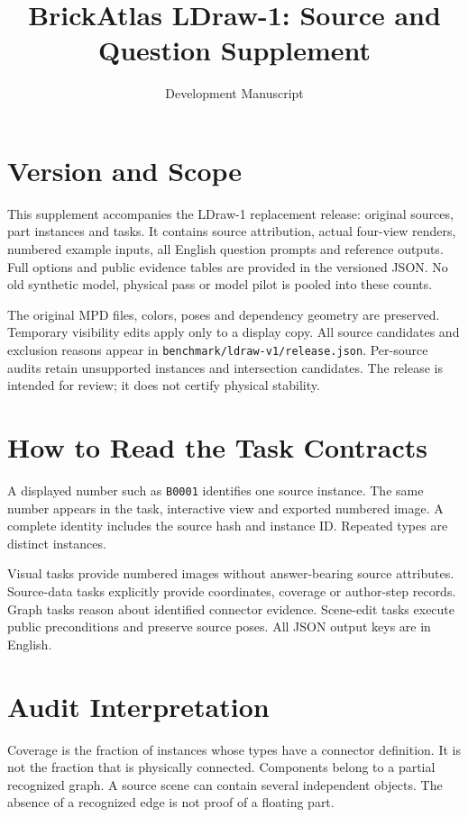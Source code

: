 \documentclass[10pt,letterpaper]{article}
\title{BrickAtlas LDraw-1: Source and Question Supplement}
\author{Development Manuscript}
\date{}
\begin{document}

\maketitle
\section{Version and Scope}
This supplement accompanies the LDraw-1 replacement release:
\LDrawSources{} original sources, \LDrawParts{} part instances and
\LDrawTasks{} tasks. It contains source attribution, actual four-view
renders, numbered example inputs, all English question prompts and
reference outputs. Full options and public evidence tables are provided
in the versioned JSON. No old synthetic model, physical pass or model
pilot is pooled into these counts.

The original MPD files, colors, poses and dependency geometry are
preserved. Temporary visibility edits apply only to a display copy.
All source candidates and exclusion reasons appear in
\texttt{benchmark/ldraw-v1/release.json}. Per-source audits retain
unsupported instances and intersection candidates. The release is
intended for review; it does not certify physical stability.

\section{How to Read the Task Contracts}
A displayed number such as \texttt{B0001} identifies one source
instance. The same number appears in the task, interactive view and
exported numbered image. A complete identity includes the source hash
and instance ID. Repeated types are distinct instances.

\begin{center}\small\end{center}

Visual tasks provide numbered images without answer-bearing source
attributes. Source-data tasks explicitly provide coordinates, coverage
or author-step records. Graph tasks reason about identified connector
evidence. Scene-edit tasks execute public preconditions and preserve
source poses. All JSON output keys are in English.

\section{Audit Interpretation}
Coverage is the fraction of instances whose types have a connector
definition. It is not the fraction that is physically connected.
Components belong to a partial recognized graph. A source scene can
contain several independent objects. The absence of a recognized edge
is not proof of a floating part.
\end{document}
